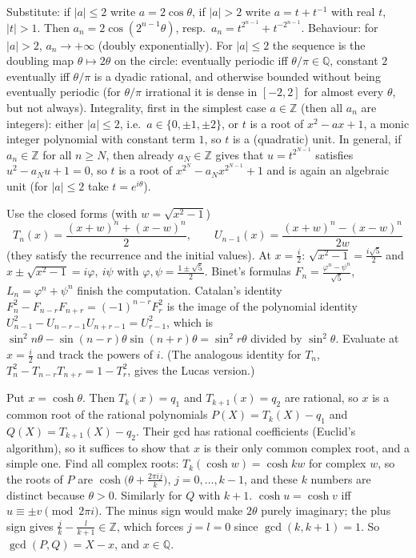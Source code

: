 \documentclass[11pt,a4paper]{article}
\begin{document}
 Substitute: if $|a|\le2$ write $a=2\cos\theta$, if $|a|>2$ write $a=t+t^{-1}$ with real $t$, $|t|>1$. Then $a_n=2\cos(2^{n-1}\theta)$, resp.\ $a_n=t^{2^{n-1}}+t^{-2^{n-1}}$.
 Behaviour: for $|a|>2$, $a_n\to+\infty$ (doubly exponentially). For $|a|\le2$ the sequence is the doubling map $\theta\mapsto2\theta$ on the circle: eventually periodic iff $\theta/\pi\in\mathbb Q$, constant $2$ eventually iff $\theta/\pi$ is a dyadic rational, and otherwise bounded without being eventually periodic (for $\theta/\pi$ irrational it is dense in $[-2,2]$ for almost every $\theta$, but not always).
 Integrality, first in the simplest case $a\in\mathbb Z$ (then all $a_n$ are integers): either $|a|\le2$, i.e.\ $a\in\{0,\pm1,\pm2\}$, or $t$ is a root of $x^2-ax+1$, a monic integer polynomial with constant term $1$, so $t$ is a (quadratic) unit.
 In general, if $a_n\in\mathbb Z$ for all $n\ge N$, then already $a_N\in\mathbb Z$ gives that $u=t^{2^{N-1}}$ satisfies $u^2-a_Nu+1=0$, so $t$ is a root of $x^{2^N}-a_Nx^{2^{N-1}}+1$ and is again an algebraic unit (for $|a|\le2$ take $t=e^{i\theta}$).

 Use the closed forms (with $w=\sqrt{x^2-1}$)
\[T_n(x)=\frac{(x+w)^n+(x-w)^n}2,\qquad U_{n-1}(x)=\frac{(x+w)^n-(x-w)^n}{2w}\]
(they satisfy the recurrence and the initial values).
 At $x=\frac i2$: $\sqrt{x^2-1}=\frac{i\sqrt5}2$ and $x\pm\sqrt{x^2-1}=i\varphi,\ i\psi$ with $\varphi,\psi=\frac{1\pm\sqrt5}2$. Binet's formulas $F_n=\frac{\varphi^n-\psi^n}{\sqrt5}$, $L_n=\varphi^n+\psi^n$ finish the computation.
 Catalan's identity $F_n^2-F_{n-r}F_{n+r}=(-1)^{n-r}F_r^2$ is the image of the polynomial identity $U_{n-1}^2-U_{n-r-1}U_{n+r-1}=U_{r-1}^2$, which is $\sin^2n\theta-\sin(n-r)\theta\sin(n+r)\theta=\sin^2r\theta$ divided by $\sin^2\theta$. Evaluate at $x=\frac i2$ and track the powers of $i$. (The analogous identity for $T_n$, $T_n^2-T_{n-r}T_{n+r}=1-T_r^2$, gives the Lucas version.)

 Put $x=\cosh\theta$. Then $T_k(x)=q_1$ and $T_{k+1}(x)=q_2$ are rational, so $x$ is a common root of the rational polynomials $P(X)=T_k(X)-q_1$ and $Q(X)=T_{k+1}(X)-q_2$. Their gcd has rational coefficients (Euclid's algorithm), so it suffices to show that $x$ is their only common complex root, and a simple one.
 Find all complex roots: $T_k(\cosh w)=\cosh kw$ for complex $w$, so the roots of $P$ are $\cosh\bigl(\theta+\frac{2\pi ij}k\bigr)$, $j=0,\dots,k-1$, and these $k$ numbers are distinct because $\theta>0$. Similarly for $Q$ with $k+1$.
 $\cosh u=\cosh v$ iff $u\equiv\pm v\pmod{2\pi i}$. The minus sign would make $2\theta$ purely imaginary; the plus sign gives $\frac jk-\frac l{k+1}\in\mathbb Z$, which forces $j=l=0$ since $\gcd(k,k+1)=1$. So $\gcd(P,Q)=X-x$, and $x\in\mathbb Q$.
\end{document}
